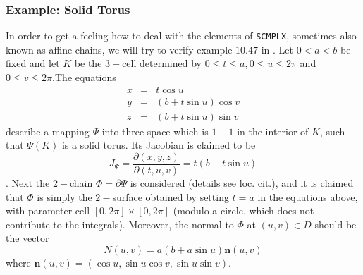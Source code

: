 \documentclass[12pt,a4paper]{article}
\begin{document}
\subsubsection{Example: Solid Torus}
In order to get a feeling how to deal with the elements of {\tt SCMPLX},
sometimes also known as affine chains, we will try to verify example
$10.47$ in \cite{PMA}.
Let $0<a<b$ be fixed and let $K$ be the $3-$cell determined by 
$0\leq t\leq a$,\,$0\leq u\leq 2\pi$ and $0\leq v\leq 2\pi$.The
equations
\begin{eqnarray*}
x &=& t \cos u \\
y &=& (b+t \sin u) \cos v \\
z &=& (b+t \sin u) \sin v
\end{eqnarray*}
describe a mapping $\Psi$ into three space which is $1-1$ in the interior
of $K$, such that $\Psi(K)$ is a solid torus. Its Jacobian is claimed to
be
\begin{displaymath}
  J_\Psi = \frac{\partial(x,y,z)}{\partial(t,u,v)}=t(b+t\sin u)
\end{displaymath}.
Next the $2-$chain $\Phi=\partial\Psi$ is considered (details see loc. cit.),
and it is claimed that $\Phi$ is simply the $2-$surface obtained by setting
$t=a$ in the equations above, with parameter cell $[0,2\pi]\times[0,2\pi]$
(modulo a circle, which does not contribute to the integrals).
Moreover, the normal to $\Phi$ at $(u,v)\in D$ should be the vector
\begin{displaymath}
   N(u,v) = a(b+a\sin u) \mathbf{n}(u,v)
\end{displaymath}
where $\mathbf{n}(u,v)=(\cos u, \sin u \cos v, \sin u \sin v)$.
\end{document}
